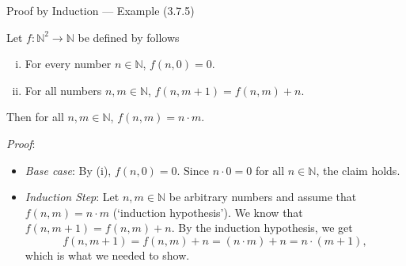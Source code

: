 \begin{frame}{Proof by Induction --- Example (3.7.5)}

Let $f:\mathbb{N}^2\to\mathbb{N}$ be defined by  follows
	\begin{enumerate}[(i)]
	
		\item For every number $n\in\mathbb{N}$, $f(n, 0)=0$.
		
		\item For all numbers $n,m\in\mathbb{N}$, $f(n,m+1)=f(n,m)+n$.
	
	\end{enumerate}
Then for all $n,m\in\mathbb{N}$, $f(n,m)=n\cdot m$.

\emph{Proof}:

\begin{itemize}

	\item \emph{Base case}: By (i), $f(n,0)=0$. Since $n\cdot 0=0$ for all $n\in\mathbb{N}$, the claim holds.
	
	\item \emph{Induction Step}: Let $n,m\in\mathbb{N}$ be arbitrary numbers and assume that $f(n,m)=n\cdot m$ (`induction hypothesis'). We know that $f(n,m+1)=f(n,m)+n$. By the induction hypothesis, we get {\small\[f(n,m+1)=f(n,m)+n=(n\cdot m)+n=n\cdot (m+1),\]} which is what we needed to show.
	
\end{itemize}
\end{frame}

